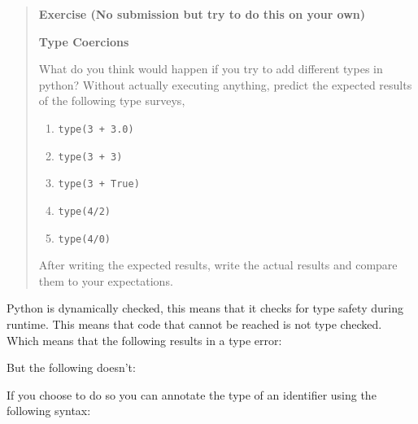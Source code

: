 \begin{quote}
\textbf{Exercise (No submission but try to do this on your own)}

\textbf{Type Coercions}

What do you think would happen if you try to add different types in
python? Without actually executing anything, predict the expected
results of the following type surveys,

\begin{enumerate}
\def\labelenumi{\arabic{enumi}.}
\tightlist
\item
  \texttt{type(3\ +\ 3.0)}
\item
  \texttt{type(3\ +\ \textquotesingle{}3\textquotesingle{})}
\item
  \texttt{type(3\ +\ True)}
\item
  \texttt{type(4/2)}
\item
  \texttt{type(4/0)}
\end{enumerate}

After writing the expected results, write the actual results and compare
them to your expectations.
\end{quote}

Python is dynamically checked, this means that it checks for type safety
during runtime. This means that code that cannot be reached is not type
checked. Which means that the following results in a type error:

\begin{Shaded}
\begin{Highlighting}[]
\NormalTok{(}\OperatorTok{+}\NormalTok{)}
\end{Highlighting}
\end{Shaded}

But the following doesn't:

\begin{Shaded}
\begin{Highlighting}[]
  \OperatorTok{==} \NormalTok{:}
    \NormalTok{(}\OperatorTok{+}\NormalTok{)}
\end{Highlighting}
\end{Shaded}

If you choose to do so you can annotate the type of an identifier using
the following syntax:

\begin{Shaded}
\begin{Highlighting}[]
 \OperatorTok{=} 
\end{Highlighting}
\end{Shaded}

